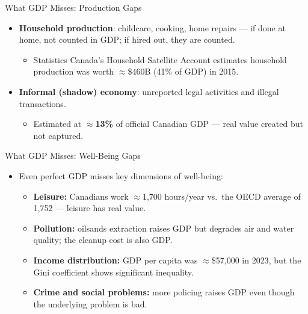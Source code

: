 \documentclass[aspectratio=169]{beamer}
\begin{document}
\begin{frame}{What GDP Misses: Production Gaps}
\transfade
\begin{itemize}[<+->]
  \item \textbf{Household production}: childcare, cooking, home repairs --- if done at home, not counted in GDP; if hired out, they are counted.
  \begin{itemize}[<+->]
    \item Statistics Canada's Household Satellite Account estimates household production was worth $\approx$\$460B (41\% of GDP) in 2015.
  \end{itemize}
  \item \textbf{Informal (shadow) economy}: unreported legal activities and illegal transactions.
  \begin{itemize}[<+->]
    \item Estimated at $\approx$\textbf{13\%} of official Canadian GDP --- real value created but not captured.
  \end{itemize}
\end{itemize}
\end{frame}

\begin{frame}{What GDP Misses: Well-Being Gaps}
\transfade
\begin{itemize}[<+->]
  \item Even perfect GDP misses key dimensions of well-being:
  \begin{itemize}[<+->]
    \item \textbf{Leisure:} Canadians work $\approx$1,700 hours/year vs.\ the OECD average of 1,752 --- leisure has real value.
    \item \textbf{Pollution:} oilsands extraction raises GDP but degrades air and water quality; the cleanup cost is also GDP.
    \item \textbf{Income distribution:} GDP per capita was $\approx$\$57,000 in 2023, but the Gini coefficient shows significant inequality.
    \item \textbf{Crime and social problems:} more policing raises GDP even though the underlying problem is bad.
  \end{itemize}
\end{itemize}
\end{frame}
\end{document}
